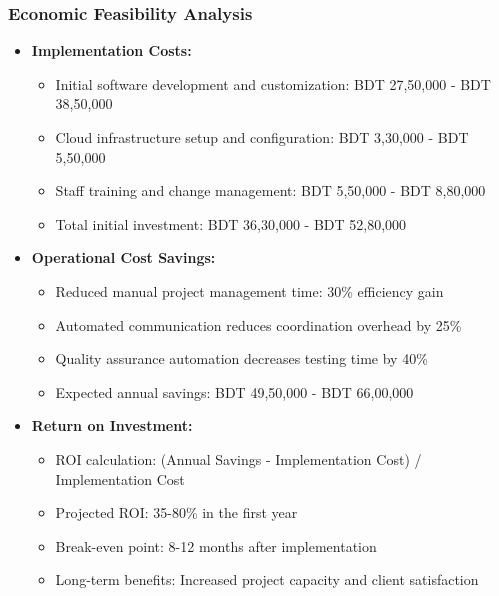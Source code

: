 \documentclass[12pt,a4paper]{article}
\begin{document}
\subsubsection{Economic Feasibility Analysis}
\begin{itemize}
    \item \textbf{Implementation Costs:}
    \begin{itemize}
        \item Initial software development and customization: BDT 27,50,000 - BDT 38,50,000
        \item Cloud infrastructure setup and configuration: BDT 3,30,000 - BDT 5,50,000
        \item Staff training and change management: BDT 5,50,000 - BDT 8,80,000
        \item Total initial investment: BDT 36,30,000 - BDT 52,80,000
    \end{itemize}
    
    \item \textbf{Operational Cost Savings:}
    \begin{itemize}
        \item Reduced manual project management time: 30\% efficiency gain
        \item Automated communication reduces coordination overhead by 25\%
        \item Quality assurance automation decreases testing time by 40\%
        \item Expected annual savings: BDT 49,50,000 - BDT 66,00,000
    \end{itemize}
    
    \item \textbf{Return on Investment:}
    \begin{itemize}
        \item ROI calculation: (Annual Savings - Implementation Cost) / Implementation Cost
        \item Projected ROI: 35-80\% in the first year
        \item Break-even point: 8-12 months after implementation
        \item Long-term benefits: Increased project capacity and client satisfaction
    \end{itemize}
\end{itemize}
\end{document}
